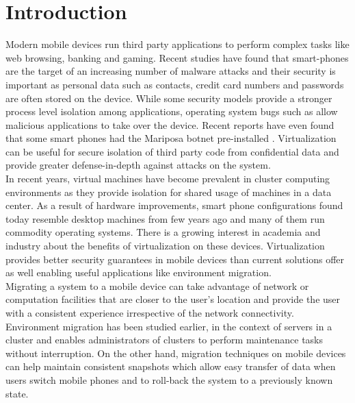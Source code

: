\section{Introduction}
Modern mobile devices run third party applications to perform complex tasks like web browsing, banking and gaming. Recent studies have found that smart-phones are the target of an increasing number of malware attacks \cite{bose2006mobile, cybercriminals2007banks, iphone2010seriot} and their security is important as personal data such as contacts, credit card numbers and passwords are often stored on the device. While some security models \cite{androidsecurity} provide a stronger process level isolation among applications, operating system bugs such as \cite{sms2009iphone,opencore2009android,kernel2009vulnerability} allow malicious applications to take over the device. Recent reports have even found that some smart phones had the Mariposa botnet pre-installed \cite{mariposa2009android}. Virtualization can be useful for secure isolation of third party code from confidential data and provide greater defense-in-depth against attacks on the system.\\

In recent years, virtual machines have become prevalent in cluster computing environments \cite{gartner2009virtual} as they provide isolation for shared usage of machines in a data center. As a result of hardware improvements, smart phone configurations found today resemble desktop machines from few years ago and many of them run commodity operating systems. There is a growing interest in academia \cite{cox2007pocket} and industry \cite{vmware2009nextfrontier} about the benefits of virtualization on these devices. Virtualization provides better security guarantees in mobile devices than current solutions offer as well enabling useful applications like environment migration. \\

Migrating a system to a mobile device can take advantage of network or computation facilities that are closer to the user's location and provide the user with a consistent experience irrespective of the network connectivity. Environment migration has been studied earlier, in the context of servers in a cluster \cite{clark2005live} and enables administrators of clusters to perform maintenance tasks without interruption. On the other hand, migration techniques on mobile devices can help maintain consistent snapshots which allow easy transfer of data when users switch mobile phones and to roll-back the system to a previously known state.\\

